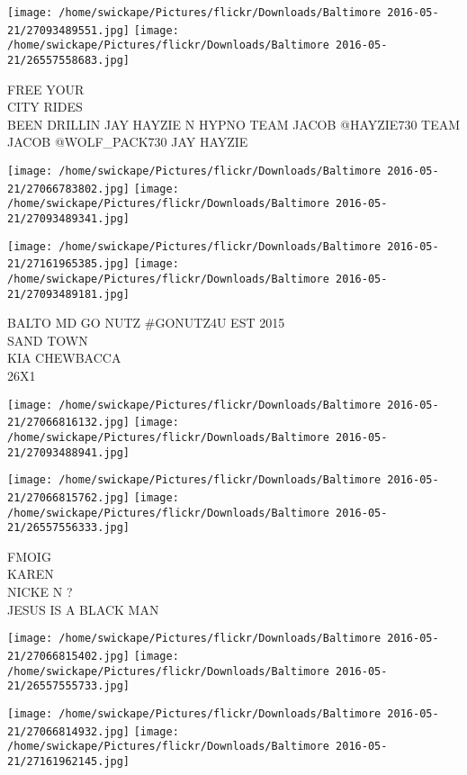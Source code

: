 \documentclass[10pt,letterpaper]{article}
\begin{document}
\vspace{0.25in}
\texttt{[image: /home/swickape/Pictures/flickr/Downloads/Baltimore 2016-05-21/27093489551.jpg]}
\texttt{[image: /home/swickape/Pictures/flickr/Downloads/Baltimore 2016-05-21/26557558683.jpg]}

FREE YOUR\\
CITY RIDES\\
BEEN DRILLIN JAY HAYZIE N HYPNO TEAM JACOB @HAYZIE730 TEAM JACOB @WOLF\_PACK730 JAY HAYZIE
\pagebreak

\texttt{[image: /home/swickape/Pictures/flickr/Downloads/Baltimore 2016-05-21/27066783802.jpg]}
\texttt{[image: /home/swickape/Pictures/flickr/Downloads/Baltimore 2016-05-21/27093489341.jpg]}

\texttt{[image: /home/swickape/Pictures/flickr/Downloads/Baltimore 2016-05-21/27161965385.jpg]}
\texttt{[image: /home/swickape/Pictures/flickr/Downloads/Baltimore 2016-05-21/27093489181.jpg]}

BALTO MD GO NUTZ \#GONUTZ4U EST 2015\\
SAND TOWN\\
KIA CHEWBACCA\\
26X1
\pagebreak

\texttt{[image: /home/swickape/Pictures/flickr/Downloads/Baltimore 2016-05-21/27066816132.jpg]}
\texttt{[image: /home/swickape/Pictures/flickr/Downloads/Baltimore 2016-05-21/27093488941.jpg]}

\texttt{[image: /home/swickape/Pictures/flickr/Downloads/Baltimore 2016-05-21/27066815762.jpg]}
\texttt{[image: /home/swickape/Pictures/flickr/Downloads/Baltimore 2016-05-21/26557556333.jpg]}

FMOIG\\
KAREN\\
NICKE N ?\\
JESUS IS A BLACK MAN
\pagebreak

\texttt{[image: /home/swickape/Pictures/flickr/Downloads/Baltimore 2016-05-21/27066815402.jpg]}
\texttt{[image: /home/swickape/Pictures/flickr/Downloads/Baltimore 2016-05-21/26557555733.jpg]}

\texttt{[image: /home/swickape/Pictures/flickr/Downloads/Baltimore 2016-05-21/27066814932.jpg]}
\texttt{[image: /home/swickape/Pictures/flickr/Downloads/Baltimore 2016-05-21/27161962145.jpg]}
\end{document}

